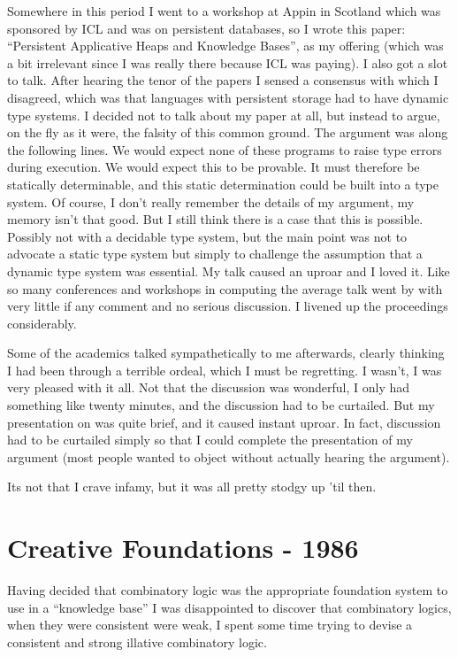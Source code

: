 Somewhere in this period I went to a workshop at Appin in Scotland which was sponsored by ICL and was on persistent databases, so I wrote this paper:
``Persistent Applicative Heaps and Knowledge Bases'', as my offering (which was a bit irrelevant since I was really there because ICL was paying).
I also got a slot to talk.
After hearing the tenor of the papers I sensed a consensus with which I disagreed, which was that languages with persistent storage had to have dynamic type systems.
I decided not to talk about my paper at all, but instead to argue, on the fly as it were, the falsity of this common ground.
The argument was along the following lines.
We would expect none of these programs to raise type errors during execution.
We would expect this to be provable.
It must therefore be statically determinable, and this static determination could be built into a type system.
Of course, I don't really remember the details of my argument, my memory isn't that good.
But I still think there is a case that this is possible.
Possibly not with a decidable type system, but the main point was not to advocate a static type system but simply to challenge the assumption that a dynamic type system was essential.
My talk caused an uproar and I loved it.
Like so many conferences and workshops in computing the average talk went by with very little if any comment and no serious discussion.
I livened up the proceedings considerably.

Some of the academics talked sympathetically to me afterwards, clearly thinking I had been through a terrible ordeal, which I must be regretting.
I wasn't, I was very pleased with it all.
Not that the discussion was wonderful, I only had something like twenty minutes, and the discussion had to be curtailed.
But my presentation on was quite brief, and it caused instant uproar.
In fact, discussion had to be curtailed simply so that I could complete the presentation of my argument (most people wanted to object without actually hearing the argument).

Its not that I crave infamy, but it was all pretty stodgy up 'til then.

\section{Creative Foundations - 1986}

Having decided that combinatory logic was the appropriate foundation system to use in a ``knowledge base'' I was disappointed to discover that combinatory logics, when they were consistent were weak, I spent
some time trying to devise a consistent and strong illative combinatory logic.

